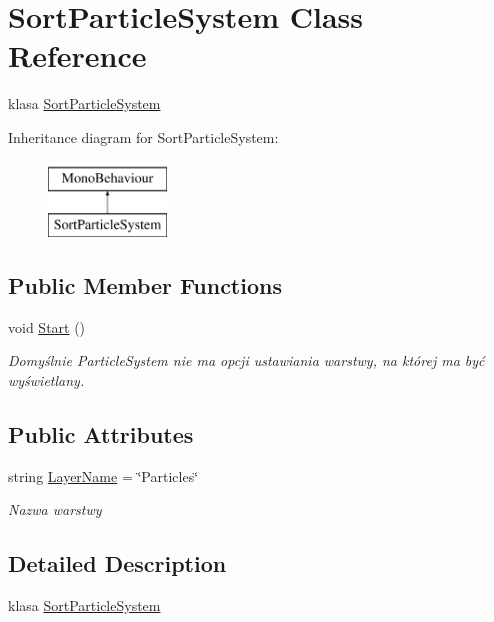 \hypertarget{class_sort_particle_system}{}\section{Sort\+Particle\+System Class Reference}
\label{class_sort_particle_system}


klasa \hyperlink{class_sort_particle_system}{Sort\+Particle\+System}  


Inheritance diagram for Sort\+Particle\+System\+:\begin{figure}[H]
\begin{center}
\leavevmode
\includegraphics[height=2.000000cm]{class_sort_particle_system}
\end{center}
\end{figure}
\subsection*{Public Member Functions}
\begin{DoxyCompactItemize}
\item 
void \hyperlink{class_sort_particle_system_a671745a1f19ee8e655d8cd4ed2ccd06e}{Start} ()
\begin{DoxyCompactList}\small\item\em Domyślnie Particle\+System nie ma opcji ustawiania warstwy, na której ma być wyświetlany. \end{DoxyCompactList}\end{DoxyCompactItemize}
\subsection*{Public Attributes}
\begin{DoxyCompactItemize}
\item 
string \hyperlink{class_sort_particle_system_a9d51c7cdcf653de70767eef676bce85d}{Layer\+Name} = \char`\"{}Particles\char`\"{}
\begin{DoxyCompactList}\small\item\em Nazwa warstwy \end{DoxyCompactList}\end{DoxyCompactItemize}


\subsection{Detailed Description}
klasa \hyperlink{class_sort_particle_system}{Sort\+Particle\+System} 




